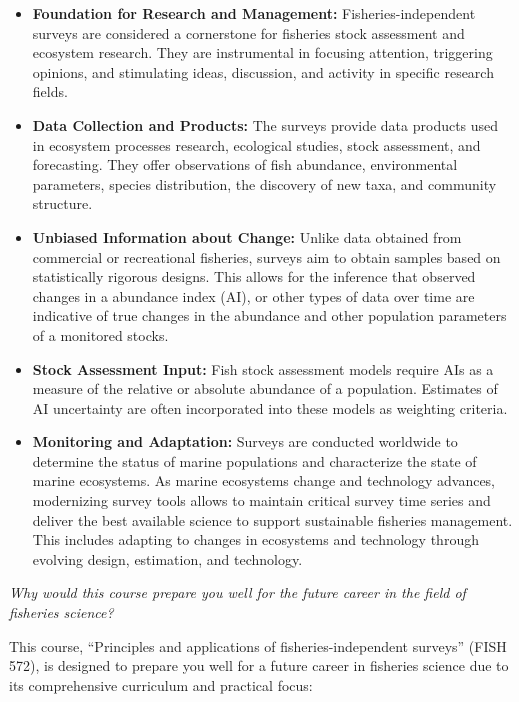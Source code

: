 \documentclass[
  letterpaper,
  oneside,
  open=any]{scrbook}
\providecommand{\tightlist}{%
  \setlength{\itemsep}{0pt}\setlength{\parskip}{0pt}}\usepackage{longtable,booktabs,array}
\begin{document}
\begin{itemize}
\tightlist
\item
  \textbf{Foundation for Research and Management:} Fisheries-independent
  surveys are considered a cornerstone for fisheries stock assessment
  and ecosystem research. They are instrumental in focusing attention,
  triggering opinions, and stimulating ideas, discussion, and activity
  in specific research fields.
\item
  \textbf{Data Collection and Products:} The surveys provide data
  products used in ecosystem processes research, ecological studies,
  stock assessment, and forecasting. They offer observations of fish
  abundance, environmental parameters, species distribution, the
  discovery of new taxa, and community structure.
\item
  \textbf{Unbiased Information about Change:} Unlike data obtained from
  commercial or recreational fisheries, surveys aim to obtain samples
  based on statistically rigorous designs. This allows for the inference
  that observed changes in a abundance index (AI), or other types of
  data over time are indicative of true changes in the abundance and
  other population parameters of a monitored stocks.
\item
  \textbf{Stock Assessment Input:} Fish stock assessment models require
  AIs as a measure of the relative or absolute abundance of a
  population. Estimates of AI uncertainty are often incorporated into
  these models as weighting criteria.
\item
  \textbf{Monitoring and Adaptation:} Surveys are conducted worldwide to
  determine the status of marine populations and characterize the state
  of marine ecosystems. As marine ecosystems change and technology
  advances, modernizing survey tools allows to maintain critical survey
  time series and deliver the best available science to support
  sustainable fisheries management. This includes adapting to changes in
  ecosystems and technology through evolving design, estimation, and
  technology.
\end{itemize}

\emph{Why would this course prepare you well for the future career in
the field of fisheries science?}

This course, ``Principles and applications of fisheries-independent
surveys'' (FISH 572), is designed to prepare you well for a future
career in fisheries science due to its comprehensive curriculum and
practical focus:
\end{document}
